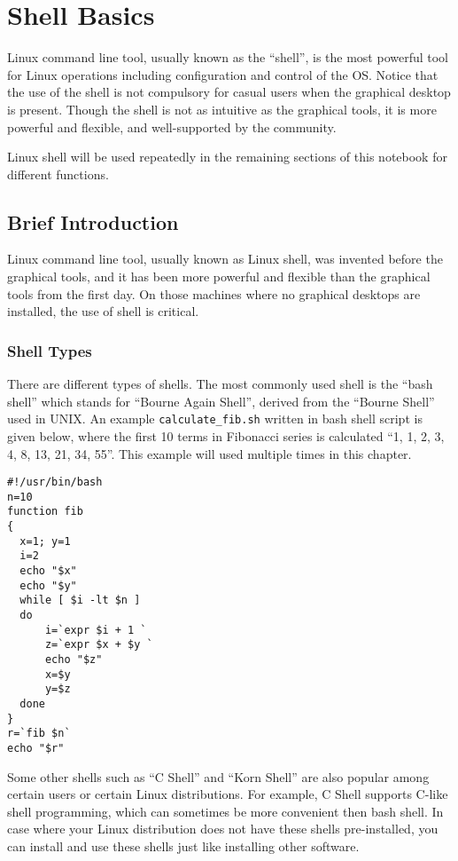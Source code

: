 \chapter{Shell Basics} \label{ch2}

Linux command line tool, usually known as the ``shell'', is the most powerful tool for Linux operations including configuration and control of the OS. Notice that the use of the shell is not compulsory for casual users when the graphical desktop is present. Though the shell is not as intuitive as the graphical tools, it is more powerful and flexible, and well-supported by the community.

Linux shell will be used repeatedly in the remaining sections of this notebook for different functions.

\section{Brief Introduction}

Linux command line tool, usually known as Linux shell, was invented before the graphical tools, and it has been more powerful and flexible than the graphical tools from the first day. On those machines where no graphical desktops are installed, the use of shell is critical.

\subsection{Shell Types}

There are different types of shells. The most commonly used shell is the ``bash shell'' which stands for ``Bourne Again Shell'', derived from the ``Bourne Shell'' used in UNIX. An example \verb|calculate_fib.sh| written in bash shell script is given below, where the first 10 terms in Fibonacci series is calculated ``1, 1, 2, 3, 4, 8, 13, 21, 34, 55''. This example will used multiple times in this chapter.

\begin{lstlisting}
#!/usr/bin/bash
n=10
function fib
{
  x=1; y=1
  i=2
  echo "$x"
  echo "$y"
  while [ $i -lt $n ]
  do
      i=`expr $i + 1 `
      z=`expr $x + $y `
      echo "$z"
      x=$y
      y=$z
  done
}
r=`fib $n`
echo "$r"
\end{lstlisting}

Some other shells such as ``C Shell'' and ``Korn Shell'' are also popular among certain users or certain Linux distributions. For example, C Shell supports C-like shell programming, which can sometimes be more convenient then bash shell. In case where your Linux distribution does not have these shells pre-installed, you can install and use these shells just like installing other software.

